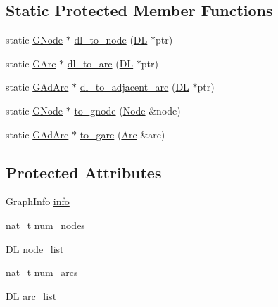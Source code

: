 \subsection*{Static Protected Member Functions}
\begin{DoxyCompactItemize}
\item 
static \hyperlink{class_designar_1_1_digraph_a33b0d2b8820ada501522b0e67e63524a}{G\+Node} $\ast$ \hyperlink{class_designar_1_1_digraph_adbb91274c17d6087fdd5721e3f9b1f7c}{dl\+\_\+to\+\_\+node} (\hyperlink{class_designar_1_1_d_l}{DL} $\ast$ptr)
\item 
static \hyperlink{class_designar_1_1_digraph_a341acf8fb0195a8986158c29c4db1a89}{G\+Arc} $\ast$ \hyperlink{class_designar_1_1_digraph_af9581e9d0825da11ce153bd055149f7f}{dl\+\_\+to\+\_\+arc} (\hyperlink{class_designar_1_1_d_l}{DL} $\ast$ptr)
\item 
static \hyperlink{class_designar_1_1_digraph_a0c6d846f23d1e82556fb6055557df53f}{G\+Ad\+Arc} $\ast$ \hyperlink{class_designar_1_1_digraph_afe3162bf2e56b177e7ee1a938ae2af8b}{dl\+\_\+to\+\_\+adjacent\+\_\+arc} (\hyperlink{class_designar_1_1_d_l}{DL} $\ast$ptr)
\item 
static \hyperlink{class_designar_1_1_digraph_a33b0d2b8820ada501522b0e67e63524a}{G\+Node} $\ast$ \hyperlink{class_designar_1_1_digraph_ae0a945e347e8e6a15df21df4fe2c1782}{to\+\_\+gnode} (\hyperlink{class_designar_1_1_digraph_a4dc921c41a480b7946a04170e997d8ae}{Node} \&node)
\item 
static \hyperlink{class_designar_1_1_digraph_a0c6d846f23d1e82556fb6055557df53f}{G\+Ad\+Arc} $\ast$ \hyperlink{class_designar_1_1_digraph_a6137e6849dcb4208e9c8daa26f303868}{to\+\_\+garc} (\hyperlink{class_designar_1_1_digraph_a0ceb278671f2a535c00fddccdeafd69f}{Arc} \&arc)
\end{DoxyCompactItemize}
\subsection*{Protected Attributes}
\begin{DoxyCompactItemize}
\item 
Graph\+Info \hyperlink{class_designar_1_1_digraph_aec655bb1b26775cb7ad3581240290efe}{info}
\item 
\hyperlink{namespace_designar_aa72662848b9f4815e7bf31a7cf3e33d1}{nat\+\_\+t} \hyperlink{class_designar_1_1_digraph_a468cec4048ff9042a288dca47ad856aa}{num\+\_\+nodes}
\item 
\hyperlink{class_designar_1_1_d_l}{DL} \hyperlink{class_designar_1_1_digraph_ac81c264dab34ca74fc62b0693c1c3543}{node\+\_\+list}
\item 
\hyperlink{namespace_designar_aa72662848b9f4815e7bf31a7cf3e33d1}{nat\+\_\+t} \hyperlink{class_designar_1_1_digraph_accd2da6bdb5bc0624e7f79c904c89328}{num\+\_\+arcs}
\item 
\hyperlink{class_designar_1_1_d_l}{DL} \hyperlink{class_designar_1_1_digraph_ad860dbe9732bc90906a486cad390637a}{arc\+\_\+list}
\end{DoxyCompactItemize}
